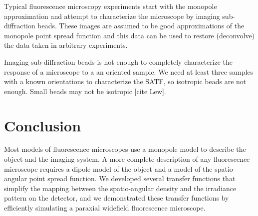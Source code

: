 \documentclass{osa-article}
\begin{document}
Typical fluorescence microscopy experiments start with the monopole
approximation and attempt to characterize the microscope by imaging
sub-diffraction beads. These images are assumed to be good approximations of the
monopole point spread function and this data can be used to restore (deconvolve)
the data taken in arbitrary experiments.

Imaging sub-diffraction beads is not enough to completely characterize the
response of a microscope to a an oriented sample. We need at least three samples
with a known orientations to characterize the SATF, so isotropic beads are not
enough. Small beads may not be isotropic [cite Lew]. 

\section{Conclusion}
Most models of fluorescence microscopes use a monopole model to describe the
object and the imaging system. A more complete description of any fluorescence
microscope requires a dipole model of the object and a model of the
spatio-angular point spread function. We developed several transfer functions
that simplify the mapping between the spatio-angular density and the irradiance
pattern on the detector, and we demonstrated these transfer functions by
efficiently simulating a paraxial widefield fluorescence microscope.




\appendix
\end{document}

